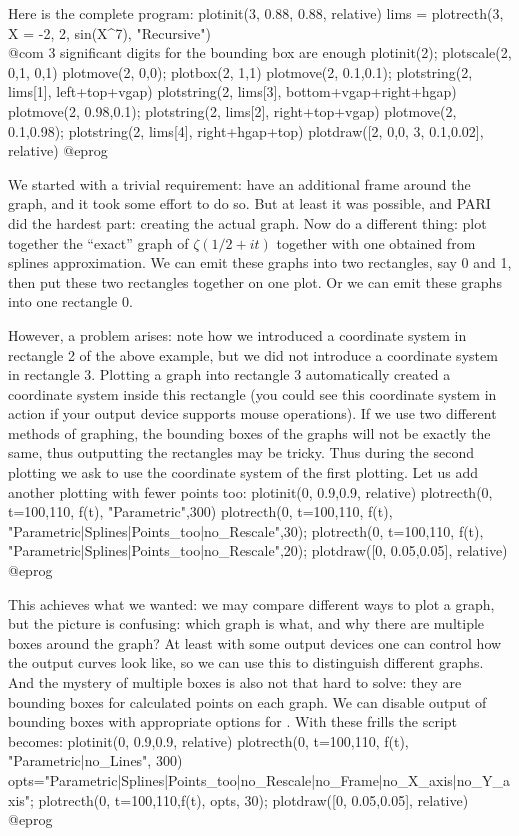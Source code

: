 Here is the complete program:
\bprog
  plotinit(3, 0.88, 0.88, relative)
  lims = plotrecth(3, X = -2, 2, sin(X^7), "Recursive")
            \\ @com $3$ significant digits for the bounding box are enough
  plotinit(2);      plotscale(2, 0,1, 0,1)
  plotmove(2, 0,0); plotbox(2, 1,1)
  plotmove(2, 0.1,0.1);
  plotstring(2, lims[1], left+top+vgap)
  plotstring(2, lims[3], bottom+vgap+right+hgap)
  plotmove(2, 0.98,0.1); plotstring(2, lims[2], right+top+vgap)
  plotmove(2, 0.1,0.98); plotstring(2, lims[4], right+hgap+top)
  plotdraw([2, 0,0,  3, 0.1,0.02], relative)
@eprog

We started with a trivial requirement: have an additional frame around
the graph, and it took some effort to do so.  But at least it was possible,
and PARI did the hardest part: creating the actual graph.
Now do a different thing: plot together the ``exact'' graph of
$\zeta({1/2}+it)$ together with one obtained from splines approximation.
We can emit these graphs into two rectangles, say 0 and 1, then put these
two rectangles together on one plot.  Or we can emit these graphs into one
rectangle 0.

However, a problem arises: note how we
introduced a coordinate system in rectangle 2 of the above example, but we
did not introduce a coordinate system in rectangle 3.  Plotting a
graph into rectangle 3 automatically created a coordinate system
inside this rectangle (you could see this coordinate system in action
if your output device supports mouse operations).  If we use two different
methods of graphing, the bounding boxes of the graphs will not be exactly
the same, thus outputting the rectangles may be tricky.  Thus during
the second plotting we ask  to use the coordinate system of
the first plotting.  Let us add another plotting with fewer
points too:
\bprog
plotinit(0, 0.9,0.9, relative)
plotrecth(0, t=100,110, f(t), "Parametric",300)
plotrecth(0, t=100,110, f(t), "Parametric|Splines|Points_too|no_Rescale",30);
plotrecth(0, t=100,110, f(t), "Parametric|Splines|Points_too|no_Rescale",20);
plotdraw([0, 0.05,0.05], relative)
@eprog

This achieves what we wanted: we may compare different ways to plot a graph,
but the picture is confusing: which graph is what, and why there are multiple
boxes around the graph?  At least with some output devices one can control
how the output curves look like, so we can use this to distinguish different
graphs.  And the mystery of multiple boxes is also not that hard to solve:
they are bounding boxes for calculated points on each graph.  We can disable
output of bounding boxes with appropriate options for .
With these frills the script becomes:
\bprog
plotinit(0, 0.9,0.9, relative)
plotrecth(0, t=100,110, f(t), "Parametric|no_Lines", 300)
opts="Parametric|Splines|Points_too|no_Rescale|no_Frame|no_X_axis|no_Y_axis";
plotrecth(0, t=100,110,f(t), opts, 30);
plotdraw([0, 0.05,0.05], relative)
@eprog

